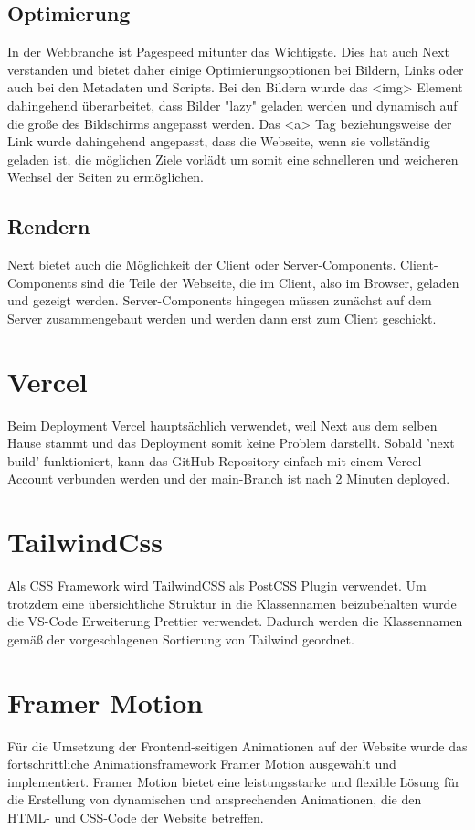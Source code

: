 \subsection{Optimierung}
In der Webbranche ist Pagespeed mitunter das Wichtigste. Dies hat auch Next verstanden und bietet daher einige Optimierungsoptionen bei Bildern, Links oder auch bei den Metadaten und Scripts. 
Bei den Bildern wurde das <img> Element dahingehend überarbeitet, dass Bilder "lazy" geladen werden und dynamisch auf die große des Bildschirms angepasst werden. 
Das <a> Tag beziehungsweise der Link wurde dahingehend angepasst, dass die Webseite, wenn sie vollständig geladen ist, die möglichen Ziele vorlädt um somit eine schnelleren und weicheren Wechsel der Seiten zu ermöglichen.

\subsection{Rendern}
Next bietet auch die Möglichkeit der Client oder Server-Components. Client-Components sind die Teile der Webseite, die im Client, also im Browser, geladen und gezeigt werden.
Server-Components hingegen müssen zunächst auf dem Server zusammengebaut werden und werden dann erst zum Client geschickt.

\section{Vercel}
Beim Deployment Vercel hauptsächlich verwendet, weil Next aus dem selben Hause stammt und das Deployment somit keine Problem darstellt.
Sobald 'next build' funktioniert, kann das GitHub Repository einfach mit einem Vercel Account verbunden werden und der main-Branch ist nach 2 Minuten deployed. 

\section{TailwindCss}
Als CSS Framework wird TailwindCSS als PostCSS Plugin verwendet. 
Um trotzdem eine übersichtliche Struktur in die Klassennamen beizubehalten wurde die VS-Code Erweiterung Prettier verwendet. 
Dadurch werden die Klassennamen gemäß der vorgeschlagenen Sortierung von Tailwind geordnet.


\section{Framer Motion}
Für die Umsetzung der Frontend-seitigen Animationen auf der Website wurde das fortschrittliche Animationsframework 
Framer Motion ausgewählt und implementiert. Framer Motion bietet eine leistungsstarke und flexible Lösung für 
die Erstellung von dynamischen und ansprechenden Animationen, die den HTML- und CSS-Code der Website betreffen.

